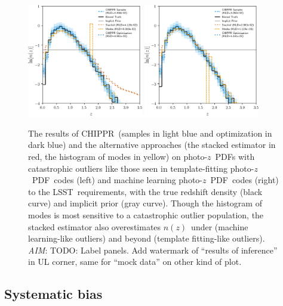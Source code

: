 \documentclass[iop]{emulateapj}
\newcommand{\todo}[3]{{\color{#2}\emph{#1}: #3}}
\newcommand{\aim}[1]{\todo{AIM}{red}{#1}}
\newcommand{\project}[1]{\textsc{#1}}
\newcommand{\lsst}{\project{LSST}}
\newcommand{\Chippr}{\project{CHIPPR}}%
\newcommand{\pz}{photo-$z$}
\newcommand{\pzpdf}{\pz\ PDF}%
\newcommand{\nz}{$n(z)$}
\begin{document}
\begin{figure}
	\begin{center}
	\includegraphics[width=0.45\textwidth]{figures/chippr/thesis_eout_log_estimators.png}
	\includegraphics[width=0.45\textwidth]{figures/chippr/thesis_rout_log_estimators.png}
	\caption{
		The results of \Chippr\ (samples in light blue and optimization in dark blue) and the alternative approaches (the stacked estimator in red, the histogram of modes in yellow) on \pzpdf s with catastrophic outliers like those seen in template-fitting \pzpdf\ codes (left) and machine learning \pzpdf\ codes (right) to the \lsst\ requirements, with the true redshift density (black curve) and implicit prior (gray curve).
		Though the histogram of modes is most sensitive to a catastrophic outlier population, the stacked estimator also overestimates \nz\ under (machine learning-like outliers) and beyond (template fitting-like outliers).
		\aim{TODO: Label panels.
		Add watermark of ``results of inference'' in UL corner, same for ``mock data'' on other kind of plot.}
	}
	\label{fig:nonuniform-outliers-results}
	\end{center}
\end{figure}

\subsection{Systematic bias}
\label{sec:bias}
\end{document}
